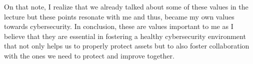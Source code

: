 \documentclass[12pt]{article}
\begin{document}
On that note, I realize that we already talked about some of these values in the lecture but these points resonate with me and thus, became my own values towards cybersecurity.
\newline
In conclusion, these are values important to me as I believe that they are essential in fostering a healthy cybersecurity environment that not only helps us to properly protect assets but to also foster collaboration with the ones we need to protect and improve together.
\end{document}
